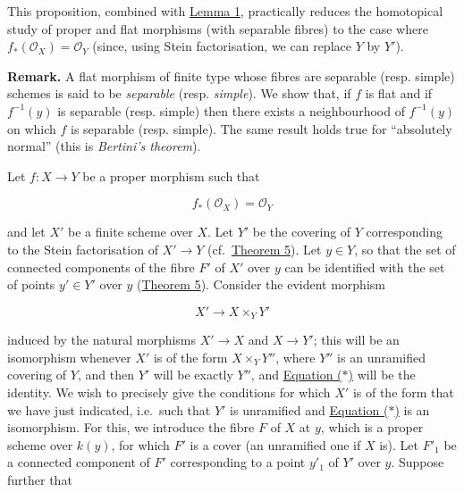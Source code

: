 \documentclass{article}
\newenvironment{rmenv}[1]
  {\phantomsection\par\smallskip\noindent\textbf{#1.}\rmfamily}
  {\par\smallskip}
\theoremstyle{definition}
\theoremstyle{definition}
\theoremstyle{definition}
\theoremstyle{definition}
\theoremstyle{remark}
\begin{document}
This proposition, combined with \protect\hyperlink{fga-2-lemma-1}{Lemma 1}, practically reduces the homotopical study of proper and flat morphisms (with separable fibres) to the case where \(f_*({\mathscr{O}}_X)={\mathscr{O}}_Y\) (since, using Stein factorisation, we can replace \(Y\) by \(Y'\)).

\begin{rmenv}{Remark}
A flat morphism of finite type whose fibres are separable (resp. simple) schemes is said to be \emph{separable} (resp. \emph{simple}).
We show that, if \(f\) is flat and if \(f^{-1}(y)\) is separable (resp. simple) then there exists a neighbourhood of \(f^{-1}(y)\) on which \(f\) is separable (resp. simple).
The same result holds true for ``absolutely normal'' (this is \emph{Bertini's theorem}).

\end{rmenv}

Let \(f\colon X\to Y\) be a proper morphism such that

\leavevmode{}%
\[
  f_*({\mathscr{O}}_X) = {\mathscr{O}}_Y
\tag{i}
\]

and let \(X'\) be a finite scheme over \(X\).
Let \(Y'\) be the covering of \(Y\) corresponding to the Stein factorisation of \(X'\to Y\) (cf.~\protect\hyperlink{fga-2-theorem-5}{Theorem 5}).
Let \(y\in Y\), so that the set of connected components of the fibre \(F'\) of \(X'\) over \(y\) can be identified with the set of points \(y'\in Y'\) over \(y\) (\protect\hyperlink{fga-2-theorem-5}{Theorem 5}).
Consider the evident morphism

\leavevmode{}%
\[
  X'\to X\times_Y Y'
\tag{$*$}
\]

induced by the natural morphisms \(X'\to X\) and \(X\to Y'\);
this will be an isomorphism whenever \(X'\) is of the form \(X\times_Y Y''\), where \(Y''\) is an unramified covering of \(Y\), and then \(Y'\) will be exactly \(Y''\), and \protect\hyperlink{fga-2-equation-asterisk}{Equation (\(*\))} will be the identity.
We wish to precisely give the conditions for which \(X'\) is of the form that we have just indicated, i.e.~such that \(Y'\) is unramified and \protect\hyperlink{fga-2-equation-asterisk}{Equation (\(*\))} is an isomorphism.
For this, we introduce the fibre \(F\) of \(X\) at \(y\), which is a proper scheme over \(k(y)\), for which \(F'\) is a cover (an unramified one if \(X\) is).
Let \(F'_1\) be a connected component of \(F'\) corresponding to a point \(y'_1\) of \(Y'\) over \(y\).
Suppose further that
\end{document}
